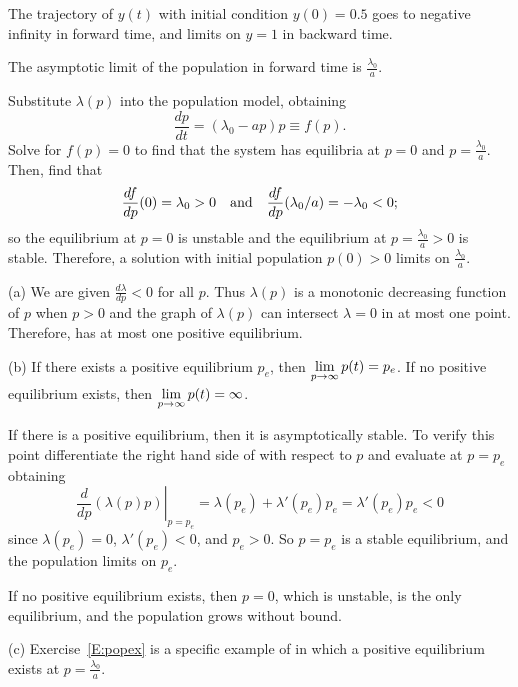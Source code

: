 \documentclass{ximera}
\begin{document}
\soln The trajectory of $y(t)$ with initial condition $y(0) = 0.5$ goes
to negative infinity in forward time, and limits on $y = 1$ in
backward time.

\begin{figure}[htb]
                       \centerline{%
                       }
\end{figure}


\newpage
{}
\ans The asymptotic limit of the population in forward time is
$\frac{\lambda_0}{a}$.

\soln Substitute $\lambda(p)$ into the population model, obtaining
\[
\frac{dp}{dt} = (\lambda_0 - ap)p\equiv f(p).
\]
Solve for $f(p)= 0$ to find that the system has equilibria
at $p = 0$ and $p = \frac{\lambda_0}{a}$.  Then, find that
\[
\frac{df}{dp}(0) = \lambda_0 > 0 \quad\mbox{and}\quad
\frac{df}{dp}(\lambda_0/a) = -\lambda_0 < 0;
\]
so the equilibrium at $p = 0$ is unstable and the equilibrium at
$p = \frac{\lambda_0}{a} > 0$ is stable.  Therefore, a solution with 
initial population $p(0) > 0$ limits on $\frac{\lambda_0}{a}$.

(a) We are given $\frac{d\lambda}{dp} < 0$ for all $p$.  Thus $\lambda(p)$ is a 
monotonic decreasing function of $p$ when $p>0$ and the graph of 
$\lambda(p)$ can intersect $\lambda=0$ in at most one point.
Therefore,  has at most one positive equilibrium.

(b) \ans If there exists a positive equilibrium $p_e$, then
$\displaystyle\lim_{p \to \infty} p(t) = p_e$.  If no positive equilibrium
exists, then $\displaystyle\lim_{p \to \infty} p(t) = \infty$.

\soln If there is a positive equilibrium, then it is asymptotically stable.
To verify this point differentiate the right hand side of  with respect to 
$p$ and evaluate at $p=p_e$ obtaining
\[
\left.\frac{d}{dp}(\lambda(p)p)\right|_{p=p_e} = 
\lambda(p_e) + \lambda'(p_e)p_e = \lambda'(p_e)p_e <0
\]
since $\lambda(p_e) = 0$, $\lambda'(p_e) < 0$, and $p_e > 0$.  
So $p = p_e$ is a stable equilibrium, and the population limits on
$p_e$.

\para If no positive equilibrium exists, then $p = 0$, which is unstable,
is the only equilibrium, and the population grows without bound.

(c) Exercise~\ref{E:popex} is a specific example of  in
which a positive equilibrium exists at $p = \frac{\lambda_0}{a}$.
\end{document}
